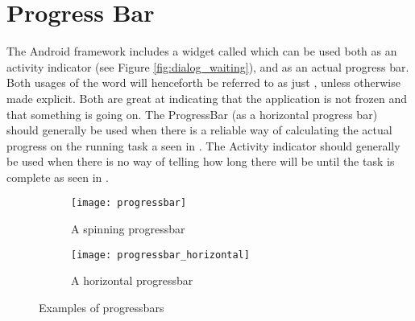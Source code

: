 
\chapter{Progress Bar}
\label{cha:progress_bar}

The Android framework includes a widget called  which can be used both as an activity indicator (see Figure \ref{fig:dialog_waiting}), and as an actual progress bar. Both usages of the word will henceforth be referred to as just , unless otherwise made explicit. Both are great at indicating that the application is not frozen and that something is going on. The ProgressBar (as a horizontal progress bar) should generally be used when there is a reliable way of calculating the actual progress on the running task a seen in . The Activity indicator should generally be used when there is no way of telling how long there will be until the task is complete as seen in .

\begin{figure}[!htbp]
    \centering
    \begin{subfigure}[t]{0.4\textwidth}
        \centering
        \texttt{[image: progressbar]}
    \caption{A spinning progressbar}
    \label{fig:spinning_progressbar}
    \end{subfigure}
    \hspace{5em} 
    \begin{subfigure}[t]{0.4\textwidth}
        \centering
        \texttt{[image: progressbar\_horizontal]}
    \caption{A horizontal progressbar}
    \label{fig:horizontal_progressbar}
    \end{subfigure}
    
    \caption{Examples of progressbars}
    \label{fig:progressbars}
\end{figure}


